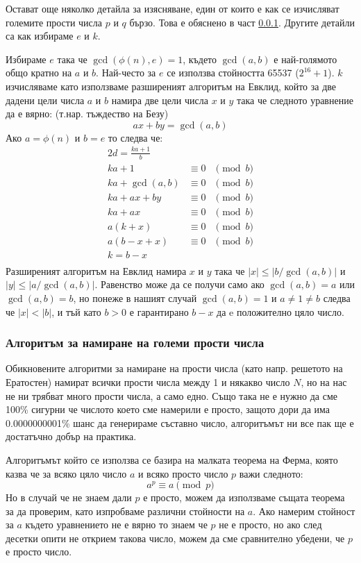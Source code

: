 Остават още няколко детайла за изясняване, един от които е как се изчисляват големите прости числа $p$ и $q$ бързо. Това е обяснено в част \ref{fermatprimes}. Другите детайли са как избираме $e$ и $k$.

Избираме $e$ така че $\gcd(\phi(n), e) = 1$, където $\gcd(a,b)$ е най-голямото общо кратно на $a$ и $b$. Най-често за $e$ се използва стойността 65537 ($2^{16}+1$). $k$ изчисляваме като използваме разширеният алгоритъм на Евклид, който за две дадени цели числа $a$ и $b$ намира две цели числа $x$ и $y$ така че следното уравнение да е вярно: (т.нар. тъждество на Безу)
$$ ax + by = \gcd(a,b) $$
Ако $a = \phi(n)$ и $b = e$ то следва че:
\begin{alignat*}{2}
d = \frac{ka+1}{b} \\
ka + 1 &\equiv 0 &\pmod b \\
ka + \gcd(a,b) &\equiv 0 &\pmod b \\
ka + ax + by &\equiv 0 &\pmod b \\
ka + ax &\equiv 0 &\pmod b \\
a(k+x) &\equiv 0 &\pmod b \\
a(b-x+x) &\equiv 0 &\pmod b \\
k = b-x \\
\end{alignat*}
Разширеният алгоритъм на Евклид намира $x$ и $y$ така че $|x|\leq|b/\gcd(a,b)|$ и $|y|\leq|a/\gcd(a,b)|$. Равенство може да се получи само ако $\gcd(a,b)=a$ или $\gcd(a,b)=b$, но понеже в нашият случай $\gcd(a,b)=1$ и $a \neq 1 \neq b$ следва че $|x|<|b|$, и тъй като $b>0$ е гарантирано $b-x$ да e положително цяло число.

\subsubsection{Алгоритъм за намиране на големи прости числа} \label{fermatprimes}
Обикновените алгоритми за намиране на прости числа (като напр. решетото на Ератостен) намират всички прости числа между 1 и някакво число $N$, но на нас не ни трябват много прости числа, а само едно. Също така не е нужно да сме 100\% сигурни че числото което сме намерили е просто, защото дори да има 0.0000000001\% шанс да генерираме съставно число, алгоритъмът ни все пак ще е достатъчно добър на практика.

Алгоритъмът който се използва се базира на малката теорема на Ферма, която казва че за всяко цяло число $a$ и всяко просто число $p$ важи следното:
$$ a^p \equiv a \pmod p $$
Но в случай че не знаем дали $p$ е просто, можем да използваме същата теорема за да проверим, като изпробваме различни стойности на $a$. Ако намерим стойност за $a$ където уравнението не е вярно то знаем че $p$ не е просто, но ако след десетки опити не открием такова число, можем да сме сравнително убедени, че $p$ е просто число.

